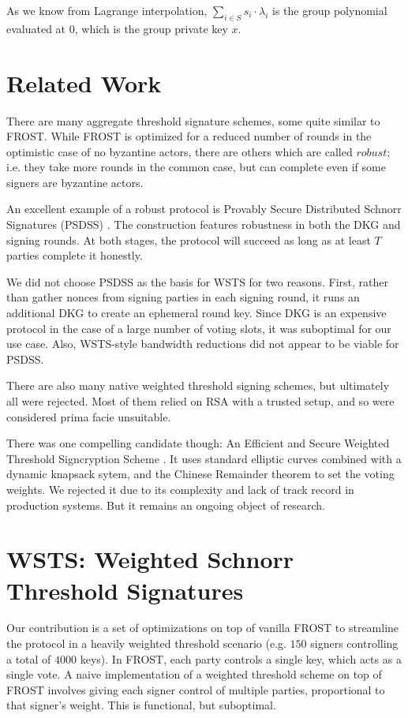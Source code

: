 \documentclass{article}
\begin{document}
As we know from Lagrange interpolation, $\sum_{i \in S}^{} s_i \cdot \lambda_i$ is the group polynomial evaluated at $0$, which is the group private key $x$.

\newpage
\onecolumn
\section{
  Related Work
}

There are many aggregate threshold signature schemes, some quite similar to FROST.  While FROST is optimized for a reduced number of rounds in the optimistic case of no byzantine actors, there are others which are called $robust$; i.e. they take more rounds in the common case, but can complete even if some signers are byzantine actors.

An excellent example of a robust protocol is Provably Secure Distributed Schnorr Signatures (PSDSS) \cite{psdss}.  The construction features robustness in both the DKG and signing rounds.  At both stages, the protocol will succeed as long as at least $T$ parties complete it honestly.

We did not choose PSDSS as the basis for WSTS for two reasons.  First, rather than gather nonces from signing parties in each signing round, it runs an additional DKG to create an ephemeral round key.  Since DKG is an expensive protocol in the case of a large number of voting slots, it was suboptimal for our use case.  Also, WSTS-style bandwidth reductions did not appear to be viable for PSDSS.

There are also many native weighted threshold signing schemes, but ultimately all were rejected.  Most of them relied on RSA with a trusted setup, and so were considered prima facie unsuitable.

There was one compelling candidate though: An Efficient and Secure Weighted Threshold Signcryption Scheme \cite{eswtss}.  It uses standard elliptic curves combined with a dynamic knapsack sytem, and the Chinese Remainder theorem to set the voting weights.  We rejected it due to its complexity and lack of track record in production systems.  But it remains an ongoing object of research.

\section{
  WSTS: Weighted Schnorr Threshold Signatures
}

Our contribution is a set of optimizations on top of vanilla FROST to streamline the protocol in a heavily weighted threshold scenario (e.g. $150$ signers controlling a total of $4000$ keys). In FROST, each party controls a single key, which acts as a single vote.  A naive implementation of a weighted threshold scheme on top of FROST involves giving each signer control of multiple parties, proportional to that signer's weight.  This is functional, but suboptimal.
\end{document}
